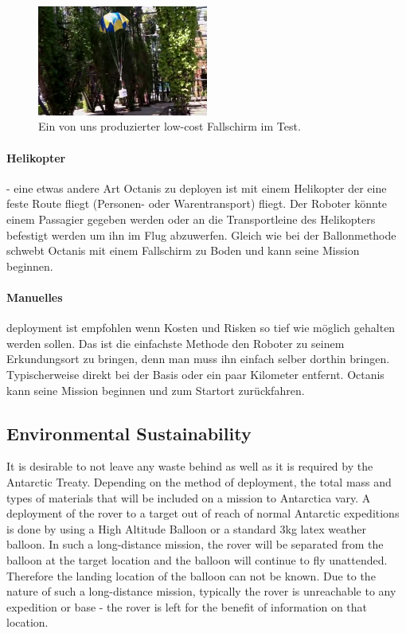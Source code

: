 \documentclass[a4paper,12pt]{article}
\begin{document}
\begin{figure}[h!]
	\centering
    \includegraphics[width=0.5\textwidth]{lowcostchute}
    \caption{Ein von uns produzierter low-cost Fallschirm im Test. }
\end{figure}


\paragraph{Helikopter} - eine etwas andere Art Octanis zu deployen ist mit einem Helikopter der eine feste Route fliegt (Personen- oder Warentransport) fliegt. Der Roboter könnte einem Passagier gegeben werden oder an die Transportleine des Helikopters befestigt werden um ihn im Flug abzuwerfen. Gleich wie bei der Ballonmethode schwebt Octanis mit einem Fallschirm zu Boden und kann seine Mission beginnen.


\paragraph{Manuelles} deployment ist empfohlen wenn Kosten und Risken so tief wie möglich gehalten werden sollen. Das ist die einfachste Methode den Roboter zu seinem Erkundungsort zu bringen, denn man muss ihn einfach selber dorthin bringen. Typischerweise direkt bei der Basis oder ein paar Kilometer entfernt. Octanis kann seine Mission beginnen und zum Startort zurückfahren.




\subsection{Environmental Sustainability}
It is desirable to not leave any waste behind as well as it is required by the Antarctic Treaty. Depending on the method of deployment, the total mass and types of materials that will be included on a mission to Antarctica vary. A deployment of the rover to a target out of reach of normal Antarctic expeditions is done by using a High Altitude Balloon or a standard 3kg latex weather balloon. In such a long-distance mission, the rover will be separated from the balloon at the target location and the balloon will continue to fly unattended. Therefore the landing location of the balloon can not be known. Due to the nature of such a long-distance mission, typically the rover is unreachable to any expedition or base - the rover is left for the benefit of information on that location.
\end{document}
